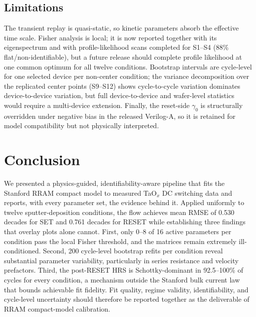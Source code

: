 \documentclass[journal]{IEEEtran}
\begin{document}
\subsection{Limitations}

The transient replay is quasi-static, so kinetic parameters absorb the
effective time scale.  Fisher analysis is local; it is now reported together
with its eigenspectrum and with profile-likelihood scans completed for S1--S4
(88\% flat/non-identifiable), but a future release should complete profile
likelihood at one common optimum for all twelve conditions.  Bootstrap
intervals are cycle-level for one selected device per non-center condition; the
variance decomposition over the replicated center points (S9--S12) shows
cycle-to-cycle variation dominates device-to-device variation, but full
device-to-device and wafer-level statistics would require a multi-device
extension.  Finally, the reset-side $\gamma_0$ is structurally overridden under
negative bias in the released Verilog-A, so it is retained for model
compatibility but not physically interpreted.

\section{Conclusion}
\label{sec:conclusion}

We presented a physics-guided, identifiability-aware pipeline that fits the
Stanford RRAM compact model to measured TaO$_x$ DC switching data and
reports, with every parameter set, the evidence behind it.  Applied
uniformly to twelve sputter-deposition conditions, the flow achieves
mean RMSE of 0.530 decades for SET and 0.761 decades for RESET while
establishing three findings that overlay plots alone cannot.  First, only
0--8 of 16 active parameters per condition pass the local Fisher threshold,
and the matrices remain extremely ill-conditioned.  Second, 200 cycle-level
bootstrap refits per condition reveal substantial parameter variability,
particularly in series resistance and velocity prefactors.  Third, the
post-RESET HRS is Schottky-dominant in 92.5--100\% of cycles for every
condition, a mechanism outside the Stanford bulk current law that bounds
achievable fit fidelity.  Fit quality, regime validity, identifiability, and
cycle-level uncertainty should therefore be reported together as the
deliverable of RRAM compact-model calibration.
\end{document}
